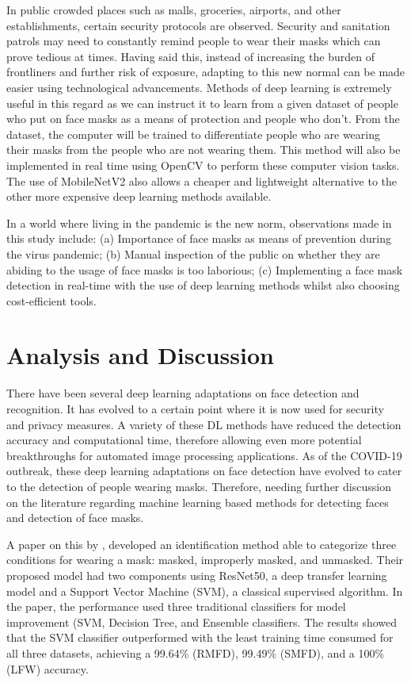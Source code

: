 \documentclass[a4paper,12pt]{article}
\begin{document}
In public crowded places such as malls, groceries, airports, and other establishments, certain security protocols are observed. Security and sanitation patrols may need to constantly remind people to wear their masks which can prove tedious at times. Having said this, instead of increasing the burden of frontliners and further risk of exposure, adapting to this new normal can be made easier using technological advancements. Methods of deep learning is extremely useful in this regard as we can instruct it to learn from a given dataset of people who put on face masks as a means of protection and people who don’t. From the dataset, the computer will be trained to differentiate people who are wearing their masks from the people who are not wearing them. This method will also be implemented in real time using OpenCV to perform these computer vision tasks. The use of MobileNetV2 also allows a cheaper and lightweight alternative to the other more expensive deep learning methods available.

In a world where living in the pandemic is the new norm, observations made in this study include: (a) Importance of face masks as means of prevention during the virus pandemic; (b) Manual inspection of the public on whether they are abiding to the usage of face masks is too laborious; (c) Implementing a face mask detection in real-time with the use of deep learning methods whilst also choosing cost-efficient tools.

\newpage
\section{Analysis and Discussion}
There have been several deep learning adaptations on face detection and recognition. It has evolved to a certain point where it is now used for security and privacy measures. A variety of these DL methods have reduced the detection accuracy and computational time, therefore allowing even more potential breakthroughs for automated image processing applications. As of the COVID-19 outbreak, these deep learning adaptations on face detection have evolved to cater to the detection of people wearing masks. Therefore, needing further discussion on the literature regarding machine learning based methods for detecting faces and detection of face masks.

A paper on this by \cite{LOEY2021108288}, developed an identification method able to categorize three conditions for wearing a mask: masked, improperly masked, and unmasked. Their proposed model had two components using ResNet50, a deep transfer learning model and a Support Vector Machine (SVM), a classical supervised algorithm. In the paper, the performance used three traditional classifiers for model improvement (SVM, Decision Tree, and Ensemble classifiers. The results showed that the SVM classifier outperformed with the least training time consumed for all three datasets, achieving a 99.64\% (RMFD), 99.49\% (SMFD), and a 100\% (LFW) accuracy.
\end{document}
